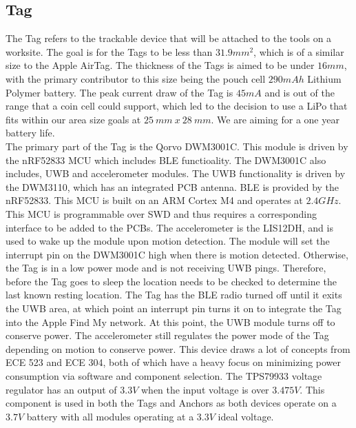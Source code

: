 \documentclass[conference]{IEEEtran}
\begin{document}
\subsection{Tag}\label{AA}
The Tag refers to the trackable device that will be attached to the tools 
on a worksite. The goal is for the Tags to be less than $31.9mm^2$, which is 
of a similar size to the Apple AirTag. The thickness of the Tags is aimed 
to be under $16mm$, with the primary contributor to this size being the 
pouch cell $290mAh$ Lithium Polymer battery. The peak current draw of the 
Tag is $45mA$ and is out of the range that a coin cell could support, 
which led to the decision to use a LiPo that fits within our area size 
goals at $25 \ mm \ x \ 28\ mm$. We are aiming for a one year battery life.
\\The primary part of the Tag is the Qorvo DWM3001C. This module is driven 
by the nRF52833 MCU which includes BLE functioality. The DWM3001C also includes, 
UWB and accelerometer modules. The UWB functionality is driven by the DWM3110,
which has an integrated PCB antenna. BLE is provided by the nRF52833. This MCU is built on an ARM Cortex 
M4 and operates at $2.4GHz$. This MCU is programmable over 
SWD and thus requires a corresponding interface to be added to the PCBs. 
The accelerometer is the LIS12DH, and is used to wake up the module 
upon motion detection. The module will set the interrupt pin on the 
DWM3001C high when there is motion detected. Otherwise, the Tag is in a 
low power mode and is not receiving UWB pings. 
Therefore, before the Tag goes to sleep the location needs to be checked 
to determine the last known resting location. The Tag has the BLE radio turned off 
until it exits the UWB area, at which point an interrupt pin turns 
it on to integrate the Tag into the Apple Find My network. At this point, the 
UWB module turns off to conserve power. The accelerometer still regulates 
the power mode of the Tag depending on motion to conserve power. This
device draws a lot of concepts from ECE 523 and ECE 304, both of which 
have a heavy focus on minimizing power consumption via software and 
component selection. The TPS79933 voltage regulator has an output of 
$3.3V$ when the input voltage is over $3.475V$. This component is used in 
both the Tags and Anchors as both devices operate on a $3.7V$ battery 
with all modules operating at a $3.3V$ ideal voltage. 
\end{document}

